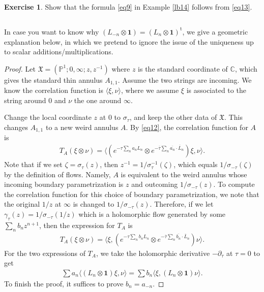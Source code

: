 \documentclass[12pt,a4paper,notitlepage]{article}
\theoremstyle{definition}
\newtheorem{exe}[df]{Exercise}
\theoremstyle{plain}
\newcommand{\fk}{\mathfrak}
\newcommand{\ovl}{\overline}
\newcommand{\tr}{\mathrm{t}} %
\newcommand{\id}{\mathbf{1}}
\newcommand{\bk}[1]{\langle {#1}\rangle}
\newcommand{\Cbb}{\mathbb C}
\newcommand{\Pbb}{\mathbb P}
\numberwithin{equation}{section}
\begin{document}
\begin{exe}
Show that the formula \eqref{eq9} in Example \ref{lb14} follows from \eqref{eq13}.
\end{exe}








\subsection{}



In case you want to know why $(L_{-n}\otimes\id)=(L_n\otimes\id)^\tr$, we give a geometric explanation below, in which we pretend to ignore the issue of the uniqueness up to scalar additions/multiplications. 


\begin{proof}
Let $\fk X=(\Pbb^1;0,\infty;z,z^{-1})$ where $z$ is the standard coordinate of $\Cbb$, which gives the standard thin annulus $A_{1,1}$. Assume the two strings are incoming.  We know the correlation function is $\bk{\xi,\nu}$, where we assume $\xi$ is associated to the string around $0$ and $\nu$ the one around $\infty$.



Change the local coordinate $z$ at $0$ to $\sigma_\tau$, and keep the other data of $\fk X$.  This changes $A_{1,1}$ to a new weird annulus $A$. By \eqref{eq12}, the correlation function for $A$ is
\begin{align*}
T_A(\xi\otimes\nu)=\bk{(e^{-\tau\sum_n a_nL_n}\otimes e^{-\ovl\tau\sum_n \ovl{a_n}\cdot \ovl L_n }) \xi,\nu}.	
\end{align*}
Note that if we set $\zeta=\sigma_\tau(z)$, then $z^{-1}=1/\sigma_\tau^{-1}(\zeta)$, which equals $1/\sigma_{-\tau}(\zeta)$ by the definition of flows. Namely, $A$ is equivalent to the weird annulus whose incoming boundary parametrization is $z$ and outcoming $1/\sigma_{-\tau}(z)$. To compute the correlation function for this choice of boundary parametrization, we note that the original $1/z$ at $\infty$ is changed to $1/\sigma_{-\tau}(z)$. Therefore, if we let $\gamma_\tau(z)=1/\sigma_{-\tau}(1/z)$ which is a holomorphic flow generated by some $\sum_n b_n z^{n+1}$, then the expression for $T_A$ is
\begin{align*}
T_A(\xi\otimes\nu)=\bk{\xi,(e^{-\tau\sum_n b_nL_n}\otimes e^{-\ovl\tau\sum_n \ovl{b_n}\cdot\ovl L_n })\nu}.	
\end{align*}
For the two expressions of $T_A$, we take the holomorphic derivative $-\partial_\tau$ at $\tau=0$ to get
\begin{align*}
\sum a_n\bk{(L_n\otimes\id)\xi,\nu}=\sum b_n\bk{\xi,(L_n\otimes\id)\nu}.	
\end{align*}
To finish the proof, it suffices to prove $b_n=a_{-n}$.


\end{proof}
\end{document}
